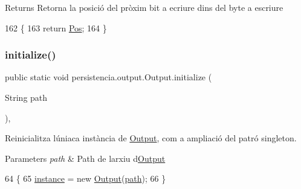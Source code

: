\begin{DoxyReturn}{Returns}
Retorna la posició del pròxim bit a ecriure dins del byte a escriure 
\end{DoxyReturn}

\begin{DoxyCode}
162                             \{
163         \textcolor{keywordflow}{return} \hyperlink{classpersistencia_1_1output_1_1Output_a3709182600423f7e57644ccdd0016f22}{Pos};
164     \}
\end{DoxyCode}
\mbox{\label{classpersistencia_1_1output_1_1Output_a3c6c71990389c7142f5f362906c44f1a}} 
\subsubsection{\texorpdfstring{initialize()}{initialize()}}
{\footnotesize\ttfamily public static void persistencia.\+output.\+Output.\+initialize (\begin{DoxyParamCaption}\item[{String}]{path }\end{DoxyParamCaption})\hspace{0.3cm}{\ttfamily [inline]}, {\ttfamily [static]}}



Reinicialitza l\textquotesingle{}úniaca instància de \hyperlink{classpersistencia_1_1output_1_1Output}{Output}, com a ampliació del patró singleton. 


\begin{DoxyParams}{Parameters}
{\em path} & Path de l\textquotesingle{}arxiu d\textquotesingle{}\hyperlink{classpersistencia_1_1output_1_1Output}{Output} \\
\hline
\end{DoxyParams}

\begin{DoxyCode}
64                                                \{
65         \hyperlink{classpersistencia_1_1output_1_1Output_aaadf14a03c4f3f585170abdc7524b63d}{instance} = \textcolor{keyword}{new} \hyperlink{classpersistencia_1_1output_1_1Output_acbb70ea9eabb2a6d0b2d7bd2f3c9009a}{Output}(\hyperlink{classpersistencia_1_1output_1_1Output_aebef717882f3bcc7080dec014c6714c9}{path});
66     \}
\end{DoxyCode}
\mbox{\label{classpersistencia_1_1output_1_1Output_a416850e57f55bd371d60b2aae8e7e983}} 
